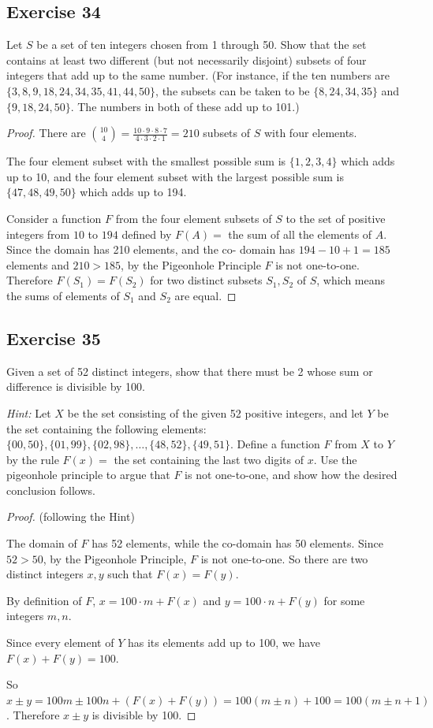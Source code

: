 \documentclass[14pt]{extarticle}
\begin{document}
\subsection{Exercise 34}
Let \(S\) be a set of ten integers chosen from 1 through 50. Show that the set contains at least two different (but 
not necessarily disjoint) subsets of four integers that add up to the same number. (For instance, if the ten numbers 
are \(\{3, 8, 9, 18, 24, 34, 35, 41, 44, 50\}\), the subsets can be taken to be \(\{8, 24, 34, 35\}\) and 
\(\{9, 18, 24, 50\}\). The numbers in both of these add up to 101.)

\begin{proof}
There are \(\binom{10}{4} = \frac{10 \cdot 9 \cdot 8 \cdot 7}{4 \cdot 3 \cdot 2 \cdot 1} = 210\) subsets of \(S\) with
four elements.

The four element subset with the smallest possible sum is \(\{1,2,3,4\}\) which adds up to 10, and the four element
subset with the largest possible sum is \(\{47,48,49,50\}\) which adds up to 194.

Consider a function \(F\) from the four element subsets of \(S\) to the set of positive integers from \(10\) to 
\(194\) defined by \(F(A) = \) the sum of all the elements of \(A\). Since the domain has 210 elements, and the co-
domain has \(194-10+1 = 185\) elements and \(210 > 185\), by the Pigeonhole Principle \(F\) is not one-to-one. 
Therefore \(F(S_1) = F(S_2)\) for two distinct subsets \(S_1, S_2\) of \(S\), which means the sums of elements of 
\(S_1\) and \(S_2\) are equal.
\end{proof}

\subsection{Exercise 35}
Given a set of 52 distinct integers, show that there must be 2 whose sum or difference is divisible by 100.

{\it Hint:} Let \(X\) be the set consisting of the given 52 positive integers, and let \(Y\) be the set containing the 
following elements: \(\{00, 50\}, \{01, 99\}, \{02, 98\}, \ldots, \{48, 52\}, \{49, 51\}\). Define a function \(F\) 
from \(X\) to \(Y\) by the rule \(F(x) =\) the set containing the last two digits of \(x\). Use the pigeonhole 
principle to argue that \(F\) is not one-to-one, and show how the desired conclusion follows.

\begin{proof}
(following the Hint)

The domain of \(F\) has 52 elements, while the co-domain has 50 elements. Since \(52 > 50\), by the Pigeonhole 
Principle, \(F\) is not one-to-one. So there are two distinct integers \(x,y\) such that \(F(x) = F(y)\).

By definition of \(F\), \(x = 100 \cdot m + F(x)\) and \(y = 100 \cdot n + F(y)\) for some integers \(m,n\). 

Since every element of \(Y\) has its elements add up to 100, we have \(F(x) + F(y) = 100\).

So \(x \pm y = 100m \pm 100n + (F(x) + F(y)) = 100(m \pm n) + 100 = 100(m \pm n+1)\). Therefore \(x \pm y\) is 
divisible by 100.
\end{proof}
\end{document}
